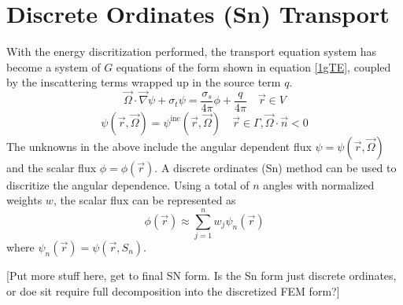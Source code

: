\documentclass{article}
\newcommand{\vr}{\vec{r}}
\newcommand{\vO}{\vec{\Omega}}
\newcommand{\vgrad}{\vec{\nabla}}
\newcommand{\sigt}{\sigma_t}
\newcommand{\sigs}{\sigma_s}
\begin{document}
\section{Discrete Ordinates (Sn) Transport}
With the energy discritization performed, the transport equation system has become a system of $G$ equations of the form shown in equation \ref{1gTE}, coupled by the inscattering terms wrapped up in the source term $q$.
\begin{equation}
\label{1gTE}
\vO \cdot \vgrad \psi + \sigt \psi = \frac{\sigs}{4 \pi} \phi + \frac{q}{4 \pi} \quad \vr \in V 
\end{equation}
\begin{equation}
\psi(\vr,\vO) = \psi^{\text{inc}}(\vr,\vO) \quad \vr \in \Gamma, \vO \cdot \vec{n} < 0
\end{equation}
The unknowns in the above include the angular dependent flux $\psi=\psi(\vr,\vO)$ and the scalar flux $\phi=\phi(\vr)$. A discrete ordinates (Sn) method can be used to discritize the angular dependence. Using a total of $n$ angles with normalized weights $w$, the scalar flux can be represented as 
\[
\phi(\vr) \approx \sum_{j=1}^n w_j \psi_n(\vr)
\] 
where $\psi_n(\vr) = \psi(\vr, S_n)$.

{\color{red}[Put more stuff here, get to final SN form. Is the Sn form just discrete ordinates, or doe sit require full decomposition into the discretized FEM form?]}
\end{document}
